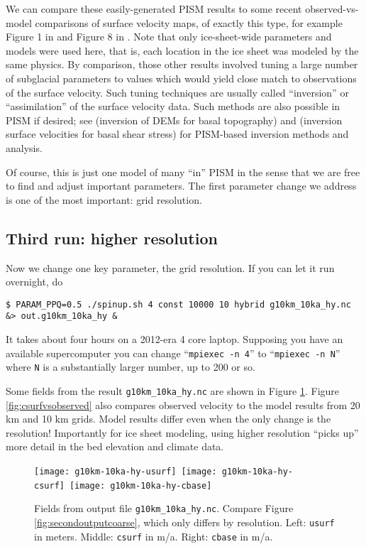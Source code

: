 We can compare these easily-generated PISM results to some recent observed-vs-model comparisons of surface velocity maps, of exactly this type, for example Figure 1 in \cite{Priceetal2011} and Figure 8 in \cite{Larouretal2012}.  Note that only ice-sheet-wide parameters and models were used here, that is, each location in the ice sheet was modeled by the same physics.  By comparison, those other results involved tuning a large number of subglacial parameters to values which would yield close match to observations of the surface velocity.  Such tuning techniques are usually called ``inversion'' or ``assimilation'' of the surface velocity data.  Such methods are also possible in PISM if desired; see \cite{vanPeltetal2013} (inversion of DEMs for basal topography) and \cite{Habermannetal2013} (inversion surface velocities for basal shear stress) for PISM-based inversion methods and analysis.

Of course, this is just one model of many ``in'' PISM in the sense that we are free to find and adjust important parameters.  The first parameter change we address is one of the most important: grid resolution.


\subsection{Third run: higher resolution}  \label{subsect:higherresrun}

Now we change one key parameter, the grid resolution.  If you can let it run overnight, do
\begin{verbatim}
$ PARAM_PPQ=0.5 ./spinup.sh 4 const 10000 10 hybrid g10km_10ka_hy.nc &> out.g10km_10ka_hy &
\end{verbatim}
It takes about four hours on a 2012-era 4 core laptop.  Supposing you have an available supercomputer you can change ``\texttt{mpiexec -n 4}'' to ``\texttt{mpiexec -n N}'' where \texttt{N} is a substantially larger number, up to 200 or so.

Some fields from the result \verb|g10km_10ka_hy.nc| are shown in Figure \ref{fig:secondoutputfiner}.  Figure \ref{fig:csurfvsobserved} also compares observed velocity to the model results from 20 km and 10 km grids.  Model results differ even when the only change is the resolution!  Importantly for ice sheet modeling, using higher resolution ``picks up'' more detail in the bed elevation and climate data.

\begin{figure}[ht]
\centering
\mbox{\texttt{[image: g10km-10ka-hy-usurf]} \texttt{[image: g10km-10ka-hy-csurf]} \texttt{[image: g10km-10ka-hy-cbase]}}
\caption{Fields from output file \texttt{g10km_10ka_hy.nc}.  Compare Figure \ref{fig:secondoutputcoarse}, which only differs by resolution.  Left: \texttt{usurf} in meters.  Middle: \texttt{csurf} in m/a.  Right: \texttt{cbase} in m/a.}
\label{fig:secondoutputfiner}
\end{figure}

